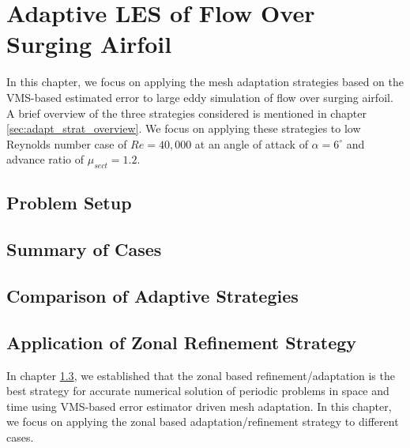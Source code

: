 \chapter{Adaptive LES of Flow Over Surging Airfoil}

In this chapter, we focus on applying the mesh adaptation strategies based on the VMS-based estimated error to large eddy simulation of flow over surging airfoil. A brief overview of the three strategies considered is mentioned in chapter \ref{sec:adapt_strat_overview}. We focus on applying these strategies to low Reynolds number case of $Re = 40, 000$ at an angle of attack of $\alpha = 6^\circ$ and advance ratio of $\mu_{sect} = 1.2$.

\section{Problem Setup}

\section{Summary of Cases}

\section{Comparison of Adaptive Strategies}
\label{sec:adaptive_strategy_comparison}




\section{Application of Zonal Refinement Strategy}


In chapter \ref{sec:adaptive_strategy_comparison}, we established that the zonal based refinement/adaptation is the best strategy for accurate numerical solution of periodic problems in space and time using VMS-based error estimator driven mesh adaptation. In this chapter, we focus on applying the zonal based adaptation/refinement strategy to different cases.

